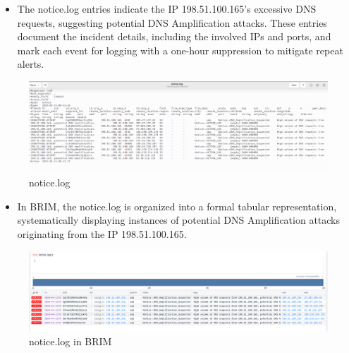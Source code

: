 \begin{itemize}
    \item The notice.log entries indicate the IP 198.51.100.165's excessive DNS requests, suggesting potential DNS Amplification attacks. These entries document the incident details, including the involved IPs and ports, and mark each event for logging with a one-hour suppression to mitigate repeat alerts.
\end{itemize}
\begin{figure}[H]
    \centering
    \includegraphics[width=1\linewidth]{images//UDP_reflection/udp_4.png}
    \caption{notice.log}
    \label{fig:enter-label}
\end{figure}

\begin{itemize}
    \item In BRIM, the notice.log is organized into a formal tabular representation, systematically displaying instances of potential DNS Amplification attacks originating from the IP 198.51.100.165.
\end{itemize}
\begin{figure}[H]
    \centering
    \includegraphics[width=0.8\linewidth]{images//UDP_reflection/udp_5.png}
    \caption{notice.log in BRIM}
    \label{fig:enter-label}
\end{figure}






